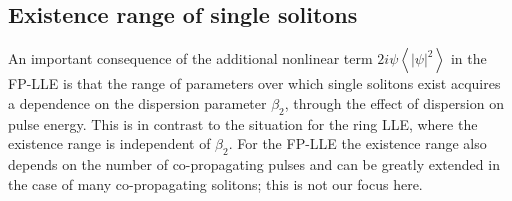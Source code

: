%


\subsection{Existence range of single solitons}
An important consequence of the additional nonlinear term $2i\psi\left<|\psi|^2\right>$ in the FP-LLE is that the range of parameters over which single solitons exist acquires a dependence on the dispersion parameter $\beta_2$, through the effect of dispersion on pulse energy.  This is in contrast to the situation for the ring LLE, where the existence range is independent of $\beta_2$. For the FP-LLE the existence range also depends on the number of co-propagating pulses and can be greatly extended in the case of many co-propagating solitons; this is not our focus here.

